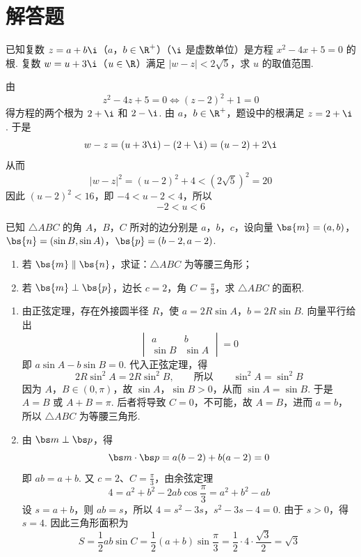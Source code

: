 \section{解答题}

\begin{problem}
已知复数 \(z = a + b\i\)（\(a\)，\(b \in \R^+\)）（\(\i\) 是虚数单位）是方程 \(x^2 - 4x + 5 = 0\) 的根. 复数 \(w = u + 3\i\)（\(u \in \R\)）满足 \(|w - z| < 2\sqrt{5}\)，求 \(u\) 的取值范围.
\end{problem}

\begin{solution}
由
\[
z^2-4z+5=0\iff (z-2)^2+1=0
\]
得方程的两个根为 \(2+\i\) 和 \(2-\i\). 由 \(a\)，\(b\in\R^+\)，题设中的根满足 \(z=2+\i\). 于是
\[
w-z=(u+3\i)-(2+\i)=(u-2)+2\i
\]
从而
\[
|w-z|^2=(u-2)^2+4<\left(2\sqrt5\right)^2=20
\]
因此 \((u-2)^2<16\)，即 \(-4<u-2<4\)，所以
\[
-2<u<6
\]
\end{solution}


\begin{problem}
已知 \(\triangle ABC\) 的角 \(A\)，\(B\)，\(C\) 所对的边分别是 \(a\)，\(b\)，\(c\)，设向量 \(\bs{m} = (a, b)\)，\(\bs{n} = (\sin B, \sin A)\)，\(\bs{p} = (b - 2, a - 2)\).

\begin{enumerate}
\item 若 \(\bs{m} \parallel \bs{n}\)，求证：\(\triangle ABC\) 为等腰三角形；

\item 若 \(\bs{m} \perp \bs{p}\)，边长 \(c = 2\)，角 \(C = \frac{\pi}{3}\)，求 \(\triangle ABC\) 的面积.
\end{enumerate}
\end{problem}

\begin{solution}
\begin{enumerate}
\item 由正弦定理，存在外接圆半径 \(R\)，使
\(a=2R\sin A\)，\(b=2R\sin B\).
  向量平行给出
  \[
  \begin{vmatrix}a&b\\ \sin B&\sin A\end{vmatrix}=0
  \]
  即 \(a\sin A-b\sin B=0\). 代入正弦定理，得
  \[
  2R\sin^2A=2R\sin^2B,\qquad\text{所以}\qquad \sin^2A=\sin^2B
  \]
  因为 \(A\)，\(B\in(0,\pi)\)，故 \(\sin A\)，\(\sin B>0\)，从而 \(\sin A=\sin B\). 于是 \(A=B\) 或 \(A+B=\pi\). 后者将导致 \(C=0\)，不可能，故 \(A=B\)，进而 \(a=b\)，所以 \(\triangle ABC\) 为等腰三角形.
\item 由 \(\bs m\perp\bs p\)，得
  \[
  \bs m\cdot\bs p=a(b-2)+b(a-2)=0
  \]
  即 \(ab=a+b\). 又 \(c=2\)、\(C=\frac{\pi}{3}\)，由余弦定理
  \[
  4=a^2+b^2-2ab\cos\frac{\pi}{3}=a^2+b^2-ab
  \]
  设 \(s=a+b\)，则 \(ab=s\)，所以
\(4=s^2-3s\)，\(s^2-3s-4=0\).
  由于 \(s>0\)，得 \(s=4\). 因此三角形面积为
  \[
  S=\frac12ab\sin C=\frac12(a+b)\sin\frac{\pi}{3}
  =\frac12\cdot4\cdot\frac{\sqrt3}{2}=\sqrt3
  \]
\end{enumerate}
\end{solution}

